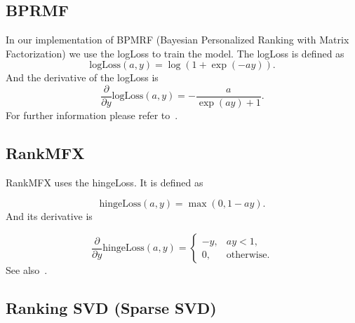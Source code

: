 \subsection{BPRMF}

In our implementation of BPMRF (Bayesian Personalized Ranking with Matrix Factorization) we use the logLoss to train the model. The logLoss is defined
as
\begin{equation}
\textrm{logLoss}(a,y)=\log(1+\exp(-ay)).
\end{equation}
And the derivative of the logLoss is
\begin{equation}
\frac{\partial}{\partial y}\textrm{logLoss}(a,y)=-\frac{a}{\exp(ay)+1}.
\end{equation}
For further information please refer to~\cite{Rendle:2009:BBP:1795114.1795167}.


\subsection{RankMFX}

RankMFX uses the hingeLoss. It is defined as

\begin{equation}
\textrm{hingeLoss}(a,y)=\max(0,1-ay).
\end{equation}
And its derivative is

\begin{equation}
\frac{\partial}{\partial y}\textrm{hingeLoss}(a,y)=\begin{cases}
-y, & ay<1,\\
0, & \textrm{otherwise}.
\end{cases}
\end{equation}
See also~\cite{diaz2012happening}.


\subsection{Ranking SVD (Sparse SVD)}

